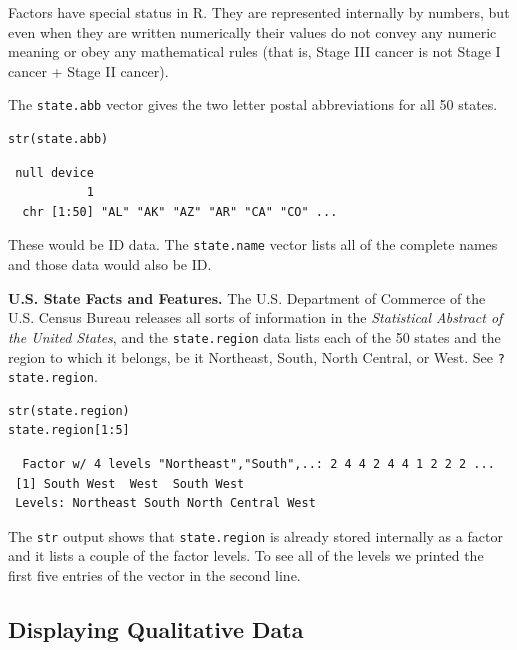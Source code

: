 \documentclass[captions=tableheading]{scrbook}
\begin{document}
Factors have special status in \textsf{R}. They are represented internally by numbers, but even when they are written numerically their values do not convey any numeric meaning or obey any mathematical rules (that is, Stage III cancer is not Stage I cancer + Stage II cancer).

\begin{example}
The \texttt{state.abb}
vector gives the two letter postal abbreviations for all 50 states.


\begin{verbatim}
str(state.abb)
\end{verbatim}

\begin{verbatim}
 null device 
           1
  chr [1:50] "AL" "AK" "AZ" "AR" "CA" "CO" ...
\end{verbatim}

These would be ID data. The \texttt{state.name} vector lists all of the complete names and those data would also be ID.
\end{example}

\begin{example}
\textbf{U.S. State Facts and Features.} The U.S. Department of Commerce of the U.S. Census Bureau releases all sorts of information in the \emph{Statistical Abstract of the United States}, and the \texttt{state.region} data lists each of the 50 states and the region to which it belongs, be it Northeast, South, North Central, or West. See \texttt{?state.region}.


\begin{verbatim}
str(state.region)
state.region[1:5]
\end{verbatim}

\begin{verbatim}
  Factor w/ 4 levels "Northeast","South",..: 2 4 4 2 4 4 1 2 2 2 ...
 [1] South West  West  South West 
 Levels: Northeast South North Central West
\end{verbatim}

The \texttt{str} output shows that \texttt{state.region} is already stored internally as a factor and it lists a couple of the factor levels. To see all of the levels we printed the first five entries of the vector in the second line.
\end{example}
\subsection{Displaying Qualitative Data}
\label{sec-2-1-4}
\end{document}
